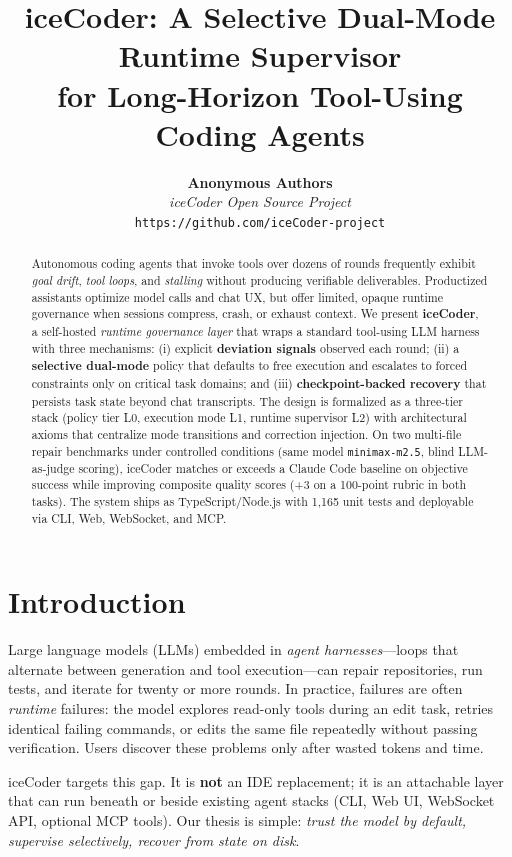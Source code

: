 \documentclass[11pt,a4paper]{article}
\title{iceCoder: A Selective Dual-Mode Runtime Supervisor\\
for Long-Horizon Tool-Using Coding Agents}
\author{
  \textbf{Anonymous Authors}\\
  \textit{iceCoder Open Source Project}\\
  \texttt{https://github.com/iceCoder-project}
}
\date{}
\begin{document}
\maketitle

\begin{abstract}
Autonomous coding agents that invoke tools over dozens of rounds frequently exhibit \emph{goal drift}, \emph{tool loops}, and \emph{stalling} without producing verifiable deliverables.
Productized assistants optimize model calls and chat UX, but offer limited, opaque runtime governance when sessions compress, crash, or exhaust context.
We present \textbf{iceCoder}, a self-hosted \emph{runtime governance layer} that wraps a standard tool-using LLM harness with three mechanisms: (i) explicit \textbf{deviation signals} observed each round; (ii) a \textbf{selective dual-mode} policy that defaults to free execution and escalates to forced constraints only on critical task domains; and (iii) \textbf{checkpoint-backed recovery} that persists task state beyond chat transcripts.
The design is formalized as a three-tier stack (policy tier L0, execution mode L1, runtime supervisor L2) with architectural axioms that centralize mode transitions and correction injection.
On two multi-file repair benchmarks under controlled conditions (same model \texttt{minimax-m2.5}, blind LLM-as-judge scoring), iceCoder matches or exceeds a Claude Code baseline on objective success while improving composite quality scores (+3 on a 100-point rubric in both tasks).
The system ships as TypeScript/Node.js with 1{,}165 unit tests and deployable via CLI, Web, WebSocket, and MCP.
\end{abstract}

\section{Introduction}
\label{sec:intro}

Large language models (LLMs) embedded in \emph{agent harnesses}---loops that alternate between generation and tool execution---can repair repositories, run tests, and iterate for twenty or more rounds.
In practice, failures are often \emph{runtime} failures: the model explores read-only tools during an edit task, retries identical failing commands, or edits the same file repeatedly without passing verification.
Users discover these problems only after wasted tokens and time.

iceCoder targets this gap.
It is \textbf{not} an IDE replacement; it is an attachable layer that can run beneath or beside existing agent stacks (CLI, Web UI, WebSocket API, optional MCP tools).
Our thesis is simple: \emph{trust the model by default, supervise selectively, recover from state on disk}.
\end{document}
